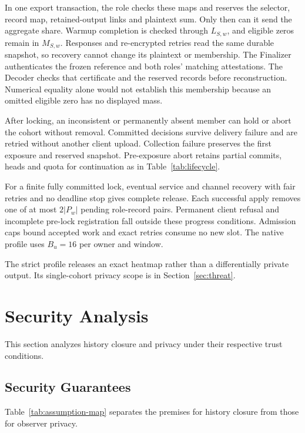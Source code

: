 \documentclass[conference,compsoc]{IEEEtran}
\theoremstyle{definition}
\numberwithin{equation}{section}
\numberwithin{table}{section}
\numberwithin{figure}{section}
\theoremstyle{plain}
\begin{document}
In one export transaction, the role checks these maps and reserves the
selector, record map, retained-output links and plaintext sum. Only then can
it send the aggregate share. Warmup completion is checked through \(L_{S,w}\),
and eligible zeros remain in \(M_{S,w}\). Responses and re-encrypted retries
read the same durable snapshot, so recovery cannot change its plaintext or
membership. The Finalizer authenticates the frozen reference and both roles'
matching attestations. The Decoder checks that certificate and the reserved
records before reconstruction. Numerical equality alone would not establish
this membership because an omitted eligible zero has no displayed mass.

After locking, an inconsistent or permanently absent member can hold or abort
the cohort without removal. Committed decisions survive delivery failure and
are retried without another client upload. Collection failure preserves the
first exposure and reserved snapshot. Pre-exposure abort retains partial commits,
heads and quota for continuation as in Table~\ref{tab:lifecycle}.

\label{prop:native-post-admission-progress}
For a finite fully committed lock, eventual service and channel recovery with
fair retries and no deadline stop gives complete release. Each successful apply
removes one of at most \(2|P_w|\) pending role-record pairs. Permanent client refusal and incomplete pre-lock registration fall outside
these progress conditions. Admission caps bound accepted work and exact retries
consume no new slot. The native profile uses \(B_u=16\) per owner and window.

\label{sec:profiles}
\label{sec:dp}
The strict profile releases an exact heatmap rather than a differentially
private output. Its single-cohort privacy scope is in Section~\ref{sec:threat}.

\section{Security Analysis}
\label{sec:security-summary}

This section analyzes history closure and privacy under their respective trust
conditions.

\subsection{Security Guarantees}

Table~\ref{tab:assumption-map} separates the premises for history closure
from those for observer privacy.
\end{document}
